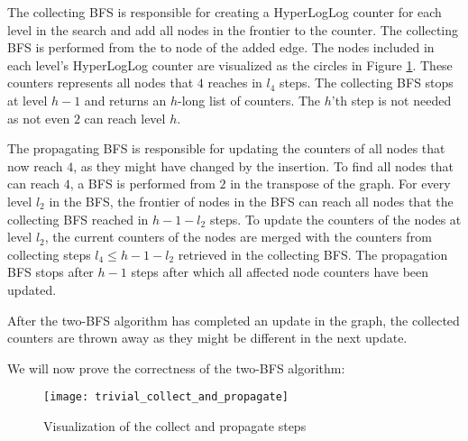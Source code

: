 The collecting BFS is responsible for creating a HyperLogLog counter for each level in the search and add all nodes in the frontier to the counter. The collecting BFS is performed from the to node of the added edge. The nodes included in each level's HyperLogLog counter are visualized as the circles in Figure \ref{fig:collect_and_propagate}. These counters represents all nodes that $4$ reaches in $l_4$ steps. The collecting BFS stops at level $h-1$ and returns an $h$-long list of counters. The $h$'th step is not needed as not even $2$ can reach level $h$.

The propagating BFS is responsible for updating the counters of all nodes that now reach $4$, as they might have changed by the insertion. To find all nodes that can reach $4$, a BFS is performed from $2$ in the transpose of the graph. For every level $l_2$ in the BFS, the frontier of nodes in the BFS can reach all nodes that the collecting BFS reached in $h-1-l_2$ steps. To update the counters of the nodes at level $l_2$, the current counters of the nodes are merged with the counters from collecting steps $l_4 \leq h-1-l_2$ retrieved in the collecting BFS. The propagation BFS stops after $h-1$ steps after which all affected node counters have been updated.

After the two-BFS algorithm has completed an update in the graph, the collected counters are thrown away as they might be different in the next update.

We will now prove the correctness of the two-BFS algorithm:

\begin{figure}[h]
\centering
\texttt{[image: trivial\_collect\_and\_propagate]}    
\captionsetup{justification=centering}
\caption {Visualization of the collect and propagate steps}
\label{fig:collect_and_propagate}
\end{figure}


